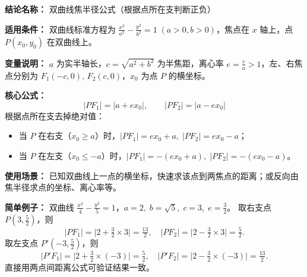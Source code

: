 \textbf{结论名称：} 双曲线焦半径公式（根据点所在支判断正负）

\textbf{适用条件：} 双曲线标准方程为 \(\frac{x^2}{a^2}-\frac{y^2}{b^2}=1\;(a>0,b>0)\)，焦点在 \(x\) 轴上，点 \(P(x_0,y_0)\) 在双曲线上。

\textbf{变量说明：} \(a\) 为实半轴长，\(c=\sqrt{a^2+b^2}\) 为半焦距，离心率 \(e=\frac{c}{a}>1\)，左、右焦点分别为 \(F_1(-c,0),\,F_2(c,0)\)，\(x_0\) 为点 \(P\) 的横坐标。

\textbf{核心公式：}
\[
\boxed{|PF_1| = |a + ex_0|,\qquad |PF_2| = |a - ex_0|}
\]
根据点所在支去掉绝对值：
\begin{itemize}
\item 当 \(P\) 在右支（\(x_0\ge a\)）时，\(|PF_1|=ex_0+a,\;|PF_2|=ex_0-a\)；
\item 当 \(P\) 在左支（\(x_0\le -a\)）时，\(|PF_1|=-(ex_0+a),\;|PF_2|=-(ex_0-a)\)。
\end{itemize}

\textbf{使用场景：} 已知双曲线上一点的横坐标，快速求该点到两焦点的距离；或反向由焦半径求点的坐标、离心率等。

\textbf{简单例子：} 双曲线 \(\frac{x^2}{4}-\frac{y^2}{5}=1\)，\(a=2,\;b=\sqrt5,\;c=3,\;e=\frac32\)。
取右支点 \(P(3,\frac52)\)，则
\[
|PF_1| = \bigl|2+\tfrac32\times3\bigr| = \tfrac{13}{2},\quad
|PF_2| = \bigl|2-\tfrac32\times3\bigr| = \tfrac52 .
\]
取左支点 \(P'(-3,\frac52)\)，则
\[
|P'F_1| = \bigl|2+\tfrac32\times(-3)\bigr| = \tfrac52,\quad
|P'F_2| = \bigl|2-\tfrac32\times(-3)\bigr| = \tfrac{13}{2} .
\]
直接用两点间距离公式可验证结果一致。